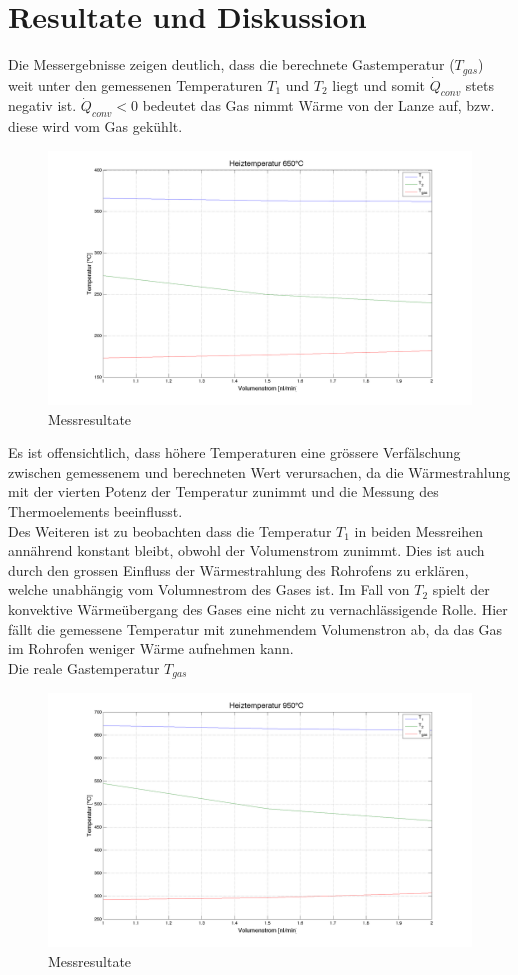 \chapter{Resultate und Diskussion}\label{sec:results}

Die Messergebnisse zeigen deutlich, dass die berechnete Gastemperatur ($T_{gas}$) weit unter den gemessenen Temperaturen $T_1$ und $T_2$ liegt und somit $\dot Q_{conv}$ stets negativ ist. $\dot Q_{conv} < 0$ bedeutet das Gas nimmt Wärme von der Lanze auf, bzw. diese wird vom Gas gekühlt.


\begin{figure}[H]
\includegraphics[width=\textwidth]{pics/figure1.png}
\caption{Messresultate}
\label{pic:figure1}
\end{figure}


Es ist offensichtlich, dass  höhere Temperaturen eine  grössere Verfälschung zwischen gemessenem und berechneten Wert verursachen, da die Wärmestrahlung mit der vierten Potenz der Temperatur zunimmt und die Messung des Thermoelements beeinflusst.\\

Des Weiteren ist zu beobachten dass die Temperatur $T_1$ in beiden Messreihen annährend konstant bleibt, obwohl der Volumenstrom zunimmt. Dies ist auch durch den grossen Einfluss der Wärmestrahlung des Rohrofens zu erklären, welche unabhängig vom Volumnestrom des Gases ist. Im Fall von $T_2$ spielt der konvektive Wärmeübergang des Gases eine nicht zu vernachlässigende Rolle. Hier fällt die gemessene Temperatur mit zunehmendem Volumenstron ab, da das Gas im Rohrofen weniger Wärme aufnehmen kann.\\

Die reale Gastemperatur $T_{gas}$ 

\begin{figure}[H]
\includegraphics[width=\textwidth]{pics/figure2.png}
\caption{Messresultate}
\label{pic:figure2}
\end{figure}


